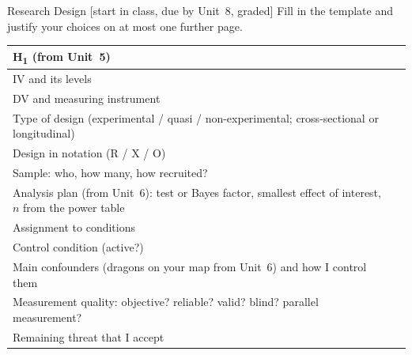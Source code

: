 \begin{uebungsblatt}{Research Design}
[start in class, due by Unit~8, graded]
Fill in the template and justify your choices on at most one further page.

\begin{center}
\renewcommand{\arraystretch}{1.5}
\begin{tabular}{|p{}|p{}|}
\hline
H\textsubscript{1} (from Unit~5) & \\[6mm] \hline
IV and its levels & \\ \hline
DV and measuring instrument & \\ \hline
Type of design (experimental / quasi / non-experimental; cross-sectional or longitudinal) & \\ \hline
Design in notation (R / X / O) & \\ \hline
Sample: who, how many, how recruited? & \\ \hline
Analysis plan (from Unit~6): test or Bayes factor, smallest effect of interest, $n$ from the power table & \\[6mm] \hline
Assignment to conditions & \\ \hline
Control condition (active?) & \\ \hline
Main confounders (dragons on your map from Unit~6) and how I control them & \\[8mm] \hline
Measurement quality: objective? reliable? valid? blind? parallel measurement? & \\[8mm] \hline
Remaining threat that I accept & \\ \hline
\end{tabular}
\end{center}
\end{uebungsblatt}

